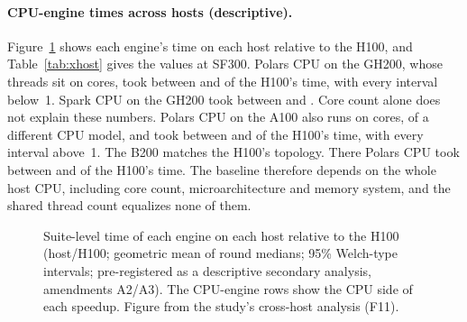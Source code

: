 \documentclass[11pt]{article}
\begin{document}
\paragraph{CPU-engine times across hosts (descriptive).}
Figure~\ref{fig:ladder} shows each engine's time on each host relative to the
H100, and Table~\ref{tab:xhost} gives the values at SF300. Polars CPU on the
GH200, whose threads sit on  cores, took between
 and 
of the H100's time, with every interval below~1.
Spark CPU on the GH200 took between 
and . Core count alone does not explain
these numbers. Polars CPU on the A100 also runs on
 cores, of a different CPU model, and took between
 and 
of the H100's time, with every interval above~1. The
B200 matches the H100's topology. There Polars CPU took between
 and 
of the H100's time. The baseline therefore depends on the whole host CPU,
including core count, microarchitecture and memory system, and the shared
thread count equalizes none of them.

\begin{figure}[t]
\centering
{}
\caption{Suite-level time of each engine on each host relative to the H100
(host/H100; geometric mean of round medians; 95\% Welch-type intervals;
pre-registered as a descriptive secondary analysis, amendments A2/A3). The
CPU-engine rows show the CPU side of each speedup. Figure from the study's
cross-host analysis (F11). \chartnote}
\label{fig:ladder}
\end{figure}
\end{document}
